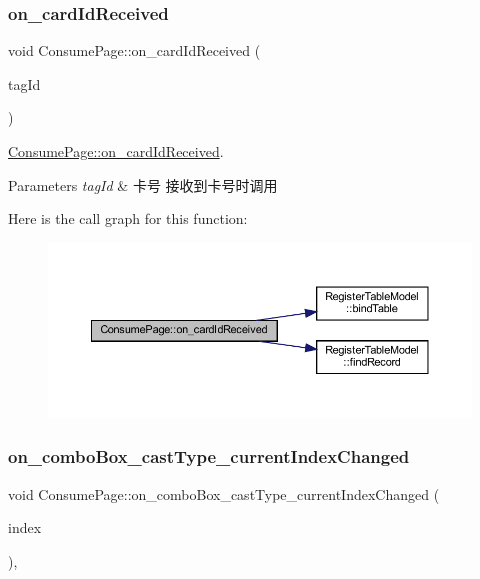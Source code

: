 \subsubsection{\texorpdfstring{on\_cardIdReceived}{on\_cardIdReceived}}
{\footnotesize\ttfamily void Consume\+Page\+::on\+\_\+card\+Id\+Received (\begin{DoxyParamCaption}\item[{Q\+String}]{tag\+Id }\end{DoxyParamCaption})\hspace{0.3cm}{\ttfamily [slot]}}



\mbox{\hyperlink{class_consume_page_a10832a40b02705ec9c951673e1a7e6da}{Consume\+Page\+::on\+\_\+card\+Id\+Received}}. 


\begin{DoxyParams}{Parameters}
{\em tag\+Id} & 卡号 接收到卡号时调用 \\
\hline
\end{DoxyParams}
Here is the call graph for this function\+:
\nopagebreak
\begin{figure}[H]
\begin{center}
\leavevmode
\includegraphics[width=350pt]{class_consume_page_a10832a40b02705ec9c951673e1a7e6da_cgraph}
\end{center}
\end{figure}
\mbox{\label{class_consume_page_a6db19d3147a2143286022e5bca7dc3fa}} 
\subsubsection{\texorpdfstring{on\_comboBox\_castType\_currentIndexChanged}{on\_comboBox\_castType\_currentIndexChanged}}
{\footnotesize\ttfamily void Consume\+Page\+::on\+\_\+combo\+Box\+\_\+cast\+Type\+\_\+current\+Index\+Changed (\begin{DoxyParamCaption}\item[{int}]{index }\end{DoxyParamCaption})\hspace{0.3cm}{\ttfamily [private]}, {\ttfamily [slot]}}



